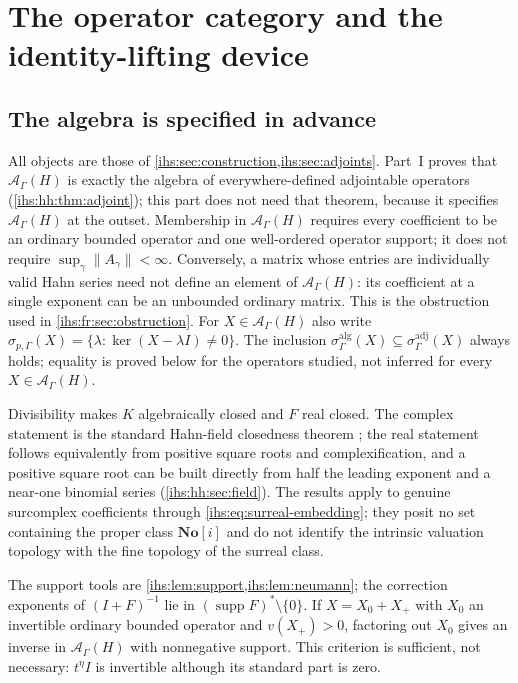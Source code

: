 \documentclass[11pt,a4paper]{article}
\numberwithin{equation}{section}
\theoremstyle{definition}
\theoremstyle{remark}
\newcommand{\No}{\mathbf{No}}
\newcommand{\K}{K}
\newcommand{\Fld}{F}
\newcommand{\Ahh}{\mathcal A_\Gamma(H)}
\newcommand{\supp}{\operatorname{supp}}
\newcommand{\norm}[1]{\lVert#1\rVert}
\begin{document}
\section{The operator category and the identity-lifting device}\label{ihs:fr:sec:framework}

\subsection{The algebra is specified in advance}\label{ihs:fr:sec:category}
All objects are those of \cref{ihs:sec:construction,ihs:sec:adjoints}. Part~I
proves that $\Ahh$ is exactly the algebra of everywhere-defined adjointable
operators (\cref{ihs:hh:thm:adjoint}); this part does not need that theorem,
because it specifies $\Ahh$ at the outset. Membership in $\Ahh$ requires every
coefficient to be an ordinary bounded operator and one well-ordered operator
support; it does not require $\sup_\gamma\norm{A_\gamma}<\infty$. Conversely,
a matrix whose entries are individually valid Hahn series need not define an
element of $\Ahh$: its coefficient at a single exponent can be an unbounded
ordinary matrix. This is the obstruction used in
\cref{ihs:fr:sec:obstruction}. For $X\in\Ahh$ also write
$\sigma_{p,\Gamma}(X)=\{\lambda:\ker(X-\lambda I)\ne0\}$. The inclusion
$\sigma^{\mathrm{alg}}_\Gamma(X)\subseteq\sigma^{\mathrm{adj}}_\Gamma(X)$
always holds; equality is proved below for the operators studied, not
inferred for every $X\in\Ahh$.

Divisibility makes $\K$ algebraically closed and $\Fld$ real closed. The
complex statement is the standard Hahn-field closedness theorem
\cite[Corollary~4]{Poonen}; the real statement follows equivalently from
positive square roots and complexification, and a positive square root can
be built directly from half the leading exponent and a near-one binomial
series (\cref{ihs:hh:sec:field}). The results apply to genuine surcomplex
coefficients through \eqref{ihs:eq:surreal-embedding}; they posit no set
containing the proper class $\No[i]$ and do not identify the intrinsic
valuation topology with the fine topology of the surreal class.

The support tools are \cref{ihs:lem:support,ihs:lem:neumann}; the correction
exponents of $(I+F)^{-1}$ lie in $(\supp F)^*\setminus\{0\}$. If
$X=X_0+X_+$ with $X_0$ an invertible ordinary bounded operator and
$v(X_+)>0$, factoring out $X_0$ gives an inverse in $\Ahh$ with nonnegative
support. This criterion is sufficient, not necessary: $t^\eta I$ is
invertible although its standard part is zero.
\end{document}
